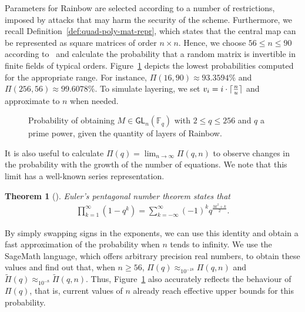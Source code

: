 \documentclass[12pt, a4paper, oneside]{memoir}
\DeclareMathOperator*{\argmin}{argmin}
\DeclarePairedDelimiter{\ceil}{\lceil}{\rceil}
\newtheorem{theorem}{Theorem}[section]
\theoremstyle{definition}
\begin{document}
Parameters for Rainbow are selected according to a number of restrictions, imposed by attacks that may harm the security of the scheme. Furthermore, we recall Definition~\ref{def:quad-poly-mat-repr}, which states that the central map can be represented as square matrices of order $n \times n$. Hence, we choose $56 \leq n \leq 90$ according to~\cite[Tabs.~6.4,~6.8,~6.13]{Petzoldt:201307} and calculate the probability that a random matrix is invertible in finite fields of typical orders. Figure~\ref{fig:prob-inv} depicts the lowest probabilities computed for the appropriate range. For instance, $\Pi(16, 90) \approx 93.3594\%$ and $\Pi(256, 56) \approx 99.6078\%$. To simulate layering, we set $v_{i} = i \cdot \ceil{\frac{n}{u}}$ and approximate to $n$ when needed.

\begin{figure}[htbp]
  \subfloat[
    $\argmin_{56 \leq n \leq 90}$ of $\Pi(q, n)$
    and $\widetilde{\Pi}(q, n)$.\label{fig:prob-inv-normal-size}
  ]{
  }
  \caption{Probability of obtaining $M \in \mathsf{GL}_{n}(\mathbb{F}_{q})$
    with $2 \leq q \leq 256$ and $q$ a prime power, given the
    quantity of layers of Rainbow.}\label{fig:prob-inv}
\end{figure}

It is also useful to calculate $\Pi(q) = \lim_{n \to \infty} \Pi(q, n)$ to observe changes in the probability with the growth of the number of equations. We note that this limit has a well-known series representation.

\begin{theorem}[{\cite[Thm.~14.3]{Apostol:2010}}]
  Euler's pentagonal number theorem states that
  \begin{align}
    \prod_{k = 1}^{\infty} (1 - q^{k}) = \sum_{k = -\infty}^{\infty}
    {(-1)}^{k} q^{\frac{3k^{2} + k}{2}}.
  \end{align}
\end{theorem}

By simply swapping signs in the exponents, we can use this identity and obtain a fast approximation of the probability when $n$ tends to infinity. We use the SageMath language, which offers arbitrary precision real numbers, to obtain these values and find out that, when $n \geq 56$, $\Pi(q) \approx_{10^{-18}} \Pi(q, n)$ and $\widetilde{\Pi}(q) \approx_{10^{-8}} \widetilde{\Pi}(q, n)$. Thus, Figure~\ref{fig:prob-inv} also accurately reflects the behaviour of $\Pi(q)$, that is, current values of $n$ already reach effective upper bounds for this probability.
\end{document}
